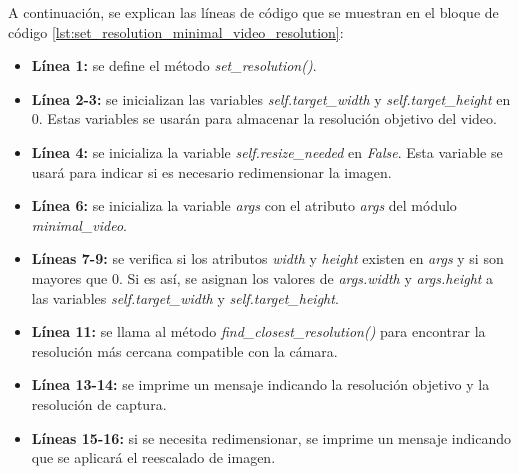 A continuación, se explican las líneas de código que se muestran en el bloque de código \ref{lst:set_resolution_minimal_video_resolution}:
\begin{itemize}
    \item \textbf{Línea 1:} se define el método \textit{set\_resolution()}.
    \item \textbf{Línea 2-3:} se inicializan las variables \textit{self.target\_width} y \textit{self.target\_height} en 0. Estas variables se usarán para almacenar la resolución objetivo del video.
    \item \textbf{Línea 4:} se inicializa la variable \textit{self.resize\_needed} en \textit{False}. Esta variable se usará para indicar si es necesario redimensionar la imagen.
    \item \textbf{Línea 6:} se inicializa la variable \textit{args} con el atributo \textit{args} del módulo \textit{minimal\_video}.
    \item \textbf{Líneas 7-9:} se verifica si los atributos \textit{width} y \textit{height} existen en \textit{args} y si son mayores que 0. Si es así, se asignan los valores de \textit{args.width} y \textit{args.height} a las variables \textit{self.target\_width} y \textit{self.target\_height}.
    \item \textbf{Línea 11:} se llama al método \textit{find\_closest\_resolution()} para encontrar la resolución más cercana compatible con la cámara.
    \item \textbf{Línea 13-14:} se imprime un mensaje indicando la resolución objetivo y la resolución de captura.
    \item \textbf{Líneas 15-16:} si se necesita redimensionar, se imprime un mensaje indicando que se aplicará el reescalado de imagen.
\end{itemize}
\vspace{\baselineskip}

